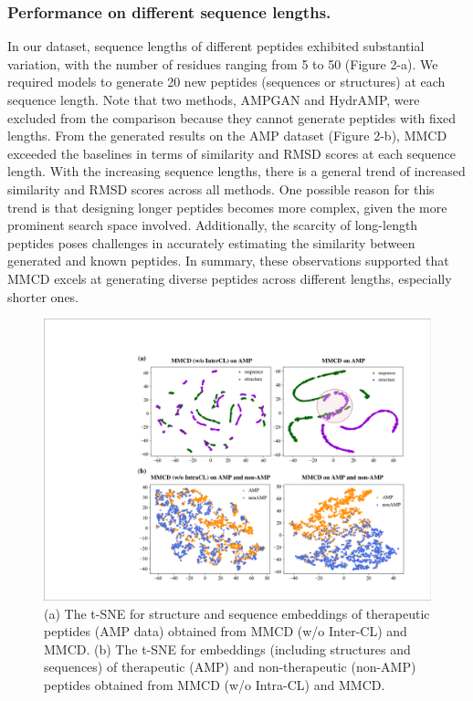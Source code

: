 \documentclass[letterpaper]{article}
\begin{document}
\subsubsection{Performance on different sequence lengths.}
In our dataset, sequence lengths of different peptides exhibited substantial variation, with the number of residues ranging from 5 to 50 (Figure 2-a). We required models to generate 20 new peptides (sequences or structures) at each sequence length. Note that two methods, AMPGAN and HydrAMP, were excluded from the comparison because they cannot generate peptides with fixed lengths. From the generated results on the AMP dataset (Figure 2-b), MMCD exceeded the baselines in terms of similarity and RMSD scores at each sequence length. With the increasing sequence lengths, there is a general trend of increased similarity and RMSD scores across all methods. One possible reason for this trend is that designing longer peptides becomes more complex, given the more prominent search space involved. Additionally, the scarcity of long-length peptides poses challenges in accurately estimating the similarity between generated and known peptides. In summary, these observations supported that MMCD excels at generating diverse peptides across different lengths, especially shorter ones.

\begin{figure}[h]
\includegraphics[scale=0.3]{fig3.pdf}
\caption{(a) The t-SNE for structure and sequence embeddings of therapeutic peptides (AMP data) obtained from MMCD (w/o Inter-CL) and MMCD. (b) The t-SNE for embeddings (including structures and sequences) of therapeutic (AMP) and non-therapeutic (non-AMP) peptides obtained from MMCD (w/o Intra-CL) and MMCD.}
\end{figure}
\end{document}
